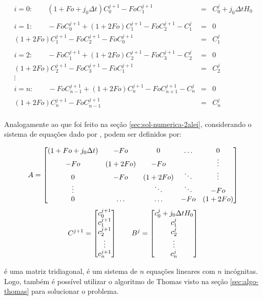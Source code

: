 \begin{equation*}
\label{eq:depoisFo}
\begin{matrix}
i = 0: \qquad (1 + Fo + j_0 \Delta t)C_0^{j+1} - FoC_{1}^{j+1} & = & C_0^j + j_0 \Delta t H_0 \\
\\
i = 1: \qquad -FoC_{0}^{j+1} + (1+2Fo)C_1^{j+1} - FoC_{2}^{j+1} - C_1^j & = & 0\\
(1+2Fo)C_1^{j+1} - FoC_{2}^{j+1} - FoC_{0}^{j+1} & = & C_1^j \\ 
\\
i = 2: \qquad -FoC_{1}^{j+1} + (1+2Fo)C_2^{j+1} - FoC_{3}^{j+1} - C_2^j & = & 0\\
(1+2Fo)C_2^{j+1} - FoC_{3}^{j+1} - FoC_{1}^{j+1} & = & C_2^j \\ 
\vdots \\
i = n: \qquad -FoC_{n-1}^{j+1} + (1+2Fo)C_n^{j+1} - FoC_{n+1}^{j+1} - C_n^j & = & 0\\
(1+2Fo)C_n^{j+1} - FoC_{n-1}^{j+1} & = & C_n^j \\
\end{matrix}
\end{equation*}

Analogamente ao que foi feito na seção \ref{sec:sol-numerica-2alei}, considerando o sistema de equações dado por ,  podem ser definidos por:

\begin{equation*}
	\cmrtext{A} =
	\begin{bmatrix}
		(1 + Fo + j_0 \Delta t) & -Fo &  0   & \ldots  & 0\\
		-Fo & (1+2Fo) &  -Fo   &        & \vdots \\
         0 & -Fo &   (1+2Fo)   & \ddots & \vdots \\
    \vdots &     &  \ddots & \ddots & -Fo \\
	     0 & \ldots & \ldots &  -Fo   & (1+2Fo) 
	\end{bmatrix}
\end{equation*}
\begin{equation*}
	\cmrtext{C^{j+1}} =
	\begin{bmatrix}
		c_0^{j+1} \\
		c_1^{j+1} \\
		c_2^{j+1} \\
		\vdots \\
		c_n^{j+1}
	\end{bmatrix}
	\qquad
	\cmrtext{B^j} =	
	\begin{bmatrix}
	c_0^j + j_0 \Delta t H_0 \\
		c_1^j \\
		c_2^{j} \\
		\vdots \\
		c_n^{j}
	\end{bmatrix}
\end{equation*}

 é uma matriz tridiagonal,  é um sistema de $n$ equações lineares com $n$ incógnitas. Logo, também é possível utilizar o algoritmo de Thomas visto na seção \ref{sec:algo-thomas} para solucionar o problema.

